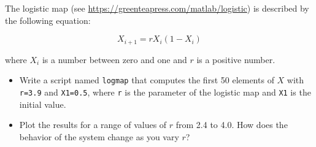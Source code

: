 \begin{ex}
The logistic map (see \url{https://greenteapress.com/matlab/logistic}) is described by the following equation:


\begin{equation}
X_{i+1} = r X_i (1-X_i)
\end{equation}

where $X_i$ is a number between zero and one and $r$ is a positive number.

\begin{itemize}

\item Write a script named {\tt logmap} that computes the first 50
elements of $X$ with {\tt r=3.9} and {\tt X1=0.5}, where
{\tt r} is the parameter of the logistic map and {\tt X1} is the
initial value.

\item Plot the results for a range of values of $r$ from 2.4 to 4.0.
How does the behavior of the system change as you vary $r$?

\end{itemize}

\end{ex}



